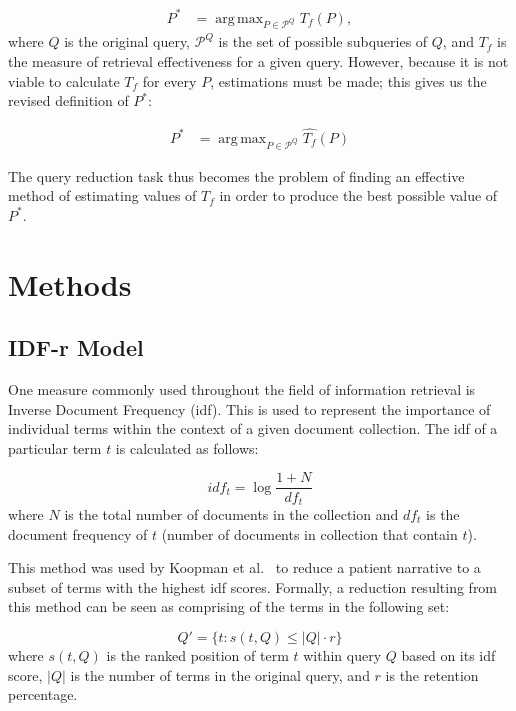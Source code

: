 \documentclass[a4paper]{report}
\DeclareMathOperator*{\argmax}{arg\,max}
\begin{document}
\begin{equation}
\begin{split}
P^* &= \argmax_{P\in \mathcal{P}^Q} T_f(P),
\end{split}
\end{equation} where $Q$ is the original query, $\mathcal{P}^Q$ is the set of possible subqueries of $Q$, and $T_f$ is the measure of retrieval effectiveness for a given query. However, because it is not viable to calculate $T_f$ for every $P$, estimations must be made; this gives us the revised definition of $P^*$:

\begin{equation}
\label{QRdefinition}
\begin{split}
P^* &= \argmax_{P\in \mathcal{P}^Q} \widehat{T_f}(P)
\end{split}
\end{equation}

The query reduction task thus becomes the problem of finding an effective method of estimating values of $T_f$ in order to produce the best possible value of $P^*$.

\section{Methods}
\subsection{IDF-r Model}
One measure commonly used throughout the field of information retrieval is Inverse Document Frequency (idf). This is used to represent the importance of individual terms within the context of a given document collection. The idf of a particular term $t$ is calculated as follows:

$$idf_t = \log{\frac{1+N}{df_t}}$$
where $N$ is the total number of documents in the collection and $df_t$ is the document frequency of $t$ (number of documents in collection that contain $t$).

This method was used by Koopman et al.~\citep{koopman2017generating} to reduce a patient narrative to a subset of terms with the highest idf scores. Formally, a reduction resulting from this method can be seen as comprising of the terms in the following set:

$$Q' = \{ t : s(t,Q) \leq |Q| \cdot r \}$$
where $s(t,Q)$ is the ranked position of term $t$ within query $Q$ based on its idf score, $|Q|$ is the number of terms in the original query, and $r$ is the retention percentage.
\end{document}
